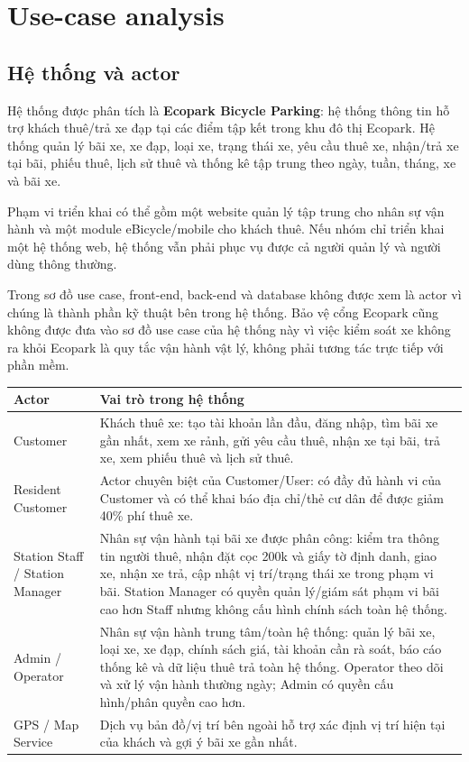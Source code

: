 \section{Use-case analysis}

\subsection{Hệ thống và actor}
Hệ thống được phân tích là \textbf{Ecopark Bicycle Parking}: hệ thống thông
tin hỗ trợ khách thuê/trả xe đạp tại các điểm tập kết trong khu đô thị Ecopark.
Hệ thống quản lý bãi xe, xe đạp, loại xe, trạng thái xe, yêu cầu thuê xe, nhận/trả
xe tại bãi, phiếu thuê, lịch sử thuê và thống kê tập trung theo ngày, tuần, tháng,
xe và bãi xe.

Phạm vi triển khai có thể gồm một website quản lý tập trung cho nhân sự vận hành
và một module eBicycle/mobile cho khách thuê. Nếu nhóm chỉ triển khai một hệ thống
web, hệ thống vẫn phải phục vụ được cả người quản lý và người dùng thông thường.

Trong sơ đồ use case, front-end, back-end và database không được xem là actor vì
chúng là thành phần kỹ thuật bên trong hệ thống. Bảo vệ cổng Ecopark cũng không
được đưa vào sơ đồ use case của hệ thống này vì việc kiểm soát xe không ra khỏi
Ecopark là quy tắc vận hành vật lý, không phải tương tác trực tiếp với phần mềm.

\begin{longtable}{P{0.24\textwidth}P{0.68\textwidth}}
\toprule
\textbf{Actor} & \textbf{Vai trò trong hệ thống} \\
\midrule
Customer & Khách thuê xe: tạo tài khoản lần đầu, đăng nhập, tìm bãi xe gần nhất, xem xe rảnh, gửi yêu cầu thuê, nhận xe tại bãi, trả xe, xem phiếu thuê và lịch sử thuê. \\
Resident Customer & Actor chuyên biệt của Customer/User: có đầy đủ hành vi của Customer và có thể khai báo địa chỉ/thẻ cư dân để được giảm 40\% phí thuê xe. \\
Station Staff / Station Manager & Nhân sự vận hành tại bãi xe được phân công: kiểm tra thông tin người thuê, nhận đặt cọc 200k và giấy tờ định danh, giao xe, nhận xe trả, cập nhật vị trí/trạng thái xe trong phạm vi bãi. Station Manager có quyền quản lý/giám sát phạm vi bãi cao hơn Staff nhưng không cấu hình chính sách toàn hệ thống. \\
Admin / Operator & Nhân sự vận hành trung tâm/toàn hệ thống: quản lý bãi xe, loại xe, xe đạp, chính sách giá, tài khoản cần rà soát, báo cáo thống kê và dữ liệu thuê trả toàn hệ thống. Operator theo dõi và xử lý vận hành thường ngày; Admin có quyền cấu hình/phân quyền cao hơn. \\
GPS / Map Service & Dịch vụ bản đồ/vị trí bên ngoài hỗ trợ xác định vị trí hiện tại của khách và gợi ý bãi xe gần nhất. \\
\bottomrule
\end{longtable}

